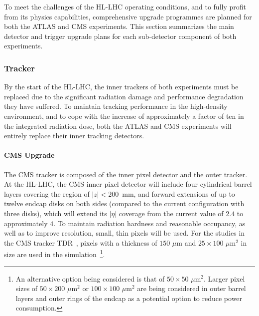 To meet the challenges of the HL-LHC operating conditions, and to fully profit from its physics capabilities, comprehensive upgrade programmes are planned for both the ATLAS and CMS experiments. This section summarizes the main detector and trigger upgrade plans for each sub-detector component of both experiments.

\subsubsection{Tracker} \label{sec:upgradetracker}


By the start of the HL-LHC, the inner trackers of both experiments must be replaced due to the significant radiation damage and performance degradation they have suffered. To maintain tracking performance in the high-density environment, and to cope with the increase of approximately a factor of ten in the integrated radiation dose, both the ATLAS and CMS experiments will entirely replace their inner tracking detectors.

\paragraph{CMS Upgrade}
The CMS tracker is composed of the inner pixel detector and the outer tracker. At the HL-LHC, the CMS inner pixel detector will include four cylindrical barrel layers covering the region of $|z| < 200$~mm, and forward extensions of up to twelve endcap disks on both sides (compared to the current configuration with three disks), which will extend its $|\eta|$ coverage from the current value of $2.4$ to approximately $4$. To maintain radiation hardness and reasonable occupancy, as well as to improve resolution, small, thin pixels will be used. For the studies in the CMS tracker TDR~\cite{Collaboration:2272264}, pixels with a thickness of $150\,\, \mu \mathrm{m}$ and $25\times100\,\,{\mu \mathrm{m}}^2$ in size are used in the simulation~\footnote{An alternative option being considered is that of $50\times50\,\,{\mu \mathrm{m}}^2$. Larger pixel sizes of $50\times200\,\,{\mu \mathrm{m}}^2$ or $100\times100\,\,{\mu \mathrm{m}}^2$ are being considered in outer barrel layers and outer rings of the endcap as a potential option to reduce power consumption.}.

